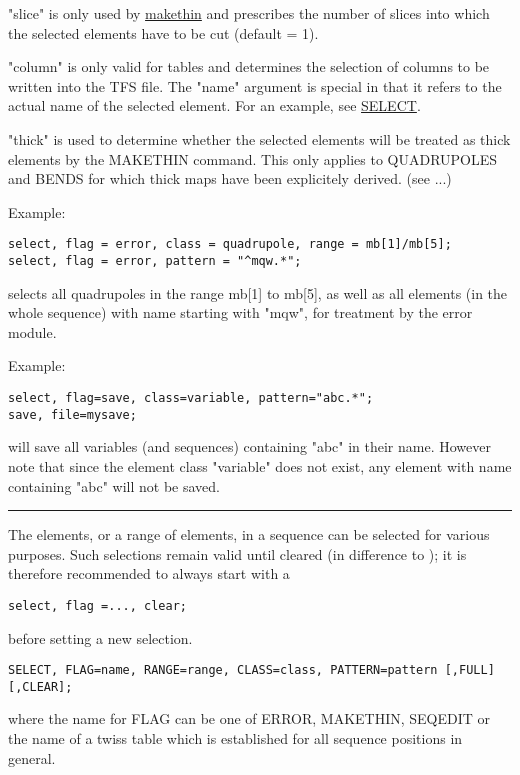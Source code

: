"slice" is only used by \href{../makethin/makethin.html}{makethin} and
prescribes the number of slices into which the selected elements have to
be cut (default = 1).  

"column" is only valid for tables and determines the selection of columns
to be written into the TFS file. The "name" argument is special in that
it refers to the actual name of the selected element. For an example,
see \href{../Introduction/select.html}{SELECT}.  

"thick" is used to determine whether the selected elements will be
treated as thick elements by the MAKETHIN command. This only applies to
QUADRUPOLES and BENDS for which thick maps have been explicitely
derived. (see ...) 

Example: 
\begin{verbatim}
select, flag = error, class = quadrupole, range = mb[1]/mb[5];
select, flag = error, pattern = "^mqw.*";
\end{verbatim} 
selects all quadrupoles in the range mb[1] to mb[5], as well as all
elements (in the whole sequence) with name starting with "mqw", for 
treatment by the error module.  

Example:  
\begin{verbatim}
select, flag=save, class=variable, pattern="abc.*";
save, file=mysave;
\end{verbatim} 
will save all variables (and sequences) containing "abc" in their name.
However note that since the element class "variable" does not exist, any
element with name containing "abc" will not be saved. 

\vskip 1cm
\hrule
\vskip 1cm


The elements, or a range of elements, in a sequence can be selected for
various purposes. Such selections remain valid until cleared (in
difference to \madeight); it is therefore recommended to always start with a  

\begin{verbatim}
select, flag =..., clear;
\end{verbatim} 
before setting a new selection. 
\begin{verbatim}
SELECT, FLAG=name, RANGE=range, CLASS=class, PATTERN=pattern [,FULL] [,CLEAR];
\end{verbatim} 
where the name for FLAG can be one of ERROR, MAKETHIN, SEQEDIT or the
name of a twiss table which is established for all sequence positions in
general.  

